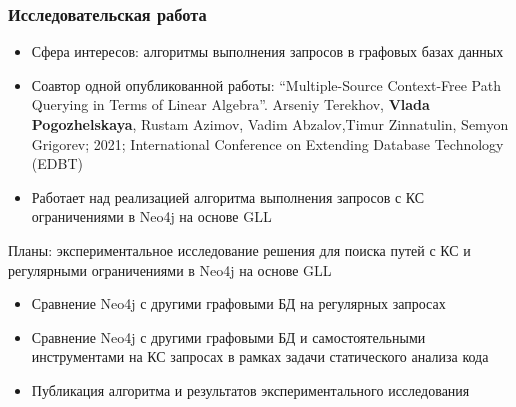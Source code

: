 \documentclass[xcolor=table,aspectratio=169]{beamer}
\begin{document}
\begin{frame}[fragile] \frametitle{Исследовательская работа}
  
    \begin{itemize}
        \item Сфера интересов: алгоритмы выполнения запросов в графовых базах данных
        \item Соавтор одной опубликованной работы: ``Multiple-Source Context-Free Path Querying in Terms of Linear Algebra''. Arseniy Terekhov,  \textbf{Vlada Pogozhelskaya}, Rustam Azimov, Vadim Abzalov,Timur Zinnatulin, Semyon Grigorev; 2021; International Conference on Extending Database Technology (EDBT)        
        \item Работает над реализацией алгоритма выполнения запросов с КС ограничениями в Neo4j на основе GLL
    \end{itemize}
  \pause
  \vfill
  Планы: экспериментальное исследование решения для поиска путей с КС и регулярными ограничениями в Neo4j на основе GLL
  \begin{itemize}
        \item Сравнение Neo4j с другими графовыми БД на регулярных запросах
        \item Сравнение Neo4j с другими графовыми БД и самостоятельными инструментами на КС запросах в рамках задачи статического анализа кода
        \item Публикация алгоритма и результатов экспериментального исследования
  \end{itemize}

\end{frame}
\end{document}
